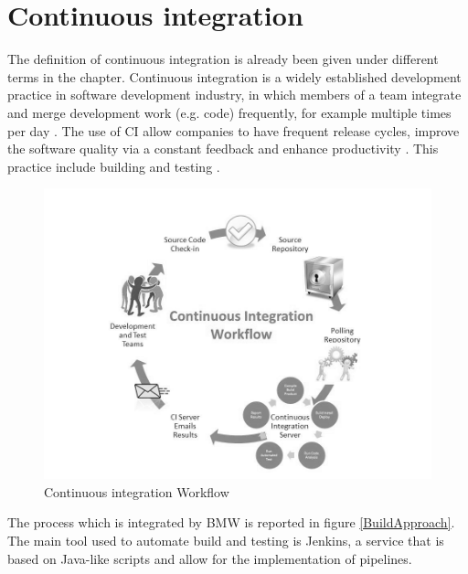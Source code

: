 \documentclass[../main.tex]{subfiles}
\begin{document}
\section{Continuous integration}
The definition of continuous integration is already been given under different terms in the chapter. Continuous integration is a widely established development practice in software development industry, in which members of a team integrate and merge development work (e.g. code) frequently, for example multiple times per day \cite{fitzgerald2017continuous}. The use of CI allow companies to have frequent release cycles, improve the software quality via a constant feedback and enhance productivity \cite{fitzgerald2017continuous}. This practice include building and testing \cite{7057604}.
\begin{figure}[h]
    \centering
    \includegraphics[width=0.8\linewidth]{images_folder/CI.jpg}
    \caption{Continuous integration Workflow}
    \label{fig:Continous Integration}
\end{figure}
The process which is integrated by \gls{BMW} is reported in figure \ref{BuildApproach}. The main tool used to automate build and testing is Jenkins, a service that is based on Java-like scripts and allow for the implementation of pipelines. 
\end{document}
